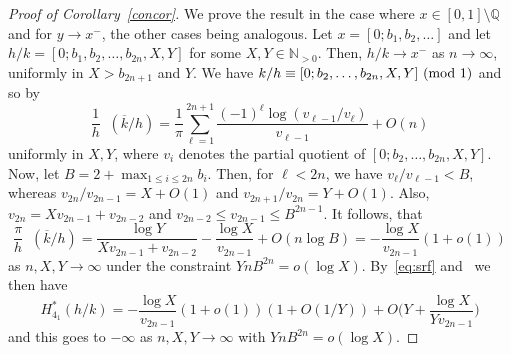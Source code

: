 \documentclass[11pt]{amsart}
\newcommand{\Q}{\mathbb{Q}}
\newcommand{\N}{\mathbb{N}}
\renewcommand{\mod}[1]{~\pr{\textnormal{mod}~#1}}
\theoremstyle{definition}
\newcommand{\pr}[1]{\mathchoice{\left( #1\right)}{(#1)}{(#1)}{(#1)}}
\DeclareMathOperator{\cz}{c_0}
\newcommand{\1}{{\mathbf 1}}
\let\originalleft\left
\let\originalright\right
\renewcommand{\left}{\mathopen{}\mathclose\bgroup\originalleft}
\renewcommand{\right}{\aftergroup\egroup\originalright}
\numberwithin{equation}{section}
\begin{document}
\begin{proof}[Proof of Corollary~\ref{concor}]
  We prove the result in the case where $x\in[0,1]\setminus\Q$ and for $y\to x^-$, the other cases being analogous. Let $x=[0;b_1,b_2,\dots]$ and let $h/k=[0;b_1,b_2,\dots,b_{2n},X,Y]$ for some $X,Y\in\N_{>0}$. Then, $h/k\to x^{-}$ as $n\to\infty$, uniformly in $X>b_{2n+1}$ and $Y$. We have $k/h\equiv [0;b_2,\dots,b_{2n},X,Y]\mod 1$ and so by~\cite[(1.2)-(1.3) and Lemma~4]{Bettin2015}
  \begin{equation*}
    \frac1h\cz(\overline k/h)=\frac{1}{\pi}\sum_{\ell=1}^{2n+1}\frac{(-1)^\ell\log(v_{\ell-1}/v_{\ell})}{v_{\ell-1}}+O(n)
  \end{equation*}
  uniformly in $X,Y$, where $v_{i}$ denotes the partial quotient of $ [0;b_2,\dots,b_{2n},X,Y]$. Now, let $B=2+\max_{1\leq i\leq 2n}b_i$. Then, for $\ell<2n$, we have 
  $ v_{\ell}/v_{\ell-1}<B$, whereas $v_{2n}/v_{2n-1}=X+O(1)$ and $v_{2n+1}/v_{2n}=Y+O(1)$. Also, $v_{2n}=X{v_{2n-1}}+{v_{2n-2}}$ and $v_{2n-2}\leq v_{2n-1}\leq B^{2n-1}$. It follows, that
  \begin{equation*}
    \frac\pi h\cz(\overline k/h)=\frac{\log Y}{X{v_{2n-1}}+{v_{2n-2}}}-\frac{\log X}{v_{2n-1}}+O(n\log B)=-\frac{\log X}{v_{2n-1}}(1+o(1))
  \end{equation*}
  as $n, X, Y\to\infty$ under the constraint $ Y n B^{2n}=o(\log X)$.
  By~\eqref{eq:srf} and~\cite[Theorem~1]{BettinDrappeaub} we then have
  \begin{equation*}
    H_{4_1}^*(h/k)=-\frac{\log X}{v_{2n-1}}(1+o(1))(1+O(1/Y))+O\Big(Y+\frac{\log X}{Y v_{2n-1}}\Big)
  \end{equation*}
  and this goes to $-\infty$ as $n,X,Y\to\infty$ with $ Y n B^{2n}=o(\log X)$.
\end{proof}



\end{document}
